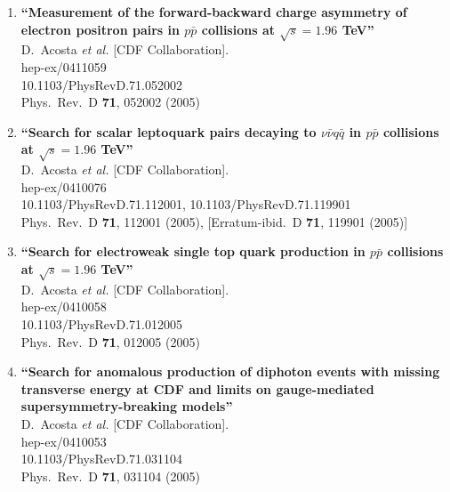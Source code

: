 \documentclass{article}
\begin{document}
\begin{enumerate}
\item%
{\bf ``Measurement of the forward-backward charge asymmetry of electron positron pairs in $p\bar{p}$ collisions at $\sqrt{s} = 1.96$ TeV''}
  \\{}D.~Acosta {\it et al.}  [CDF Collaboration].
  \\{}hep-ex/0411059
    \\{}10.1103/PhysRevD.71.052002
\\{}Phys.\ Rev.\ D {\bf 71}, 052002 (2005) %


\item%
{\bf ``Search for scalar leptoquark pairs decaying to $\nu \bar{\nu} q \bar{q}$ in $p\bar{p}$ collisions at $\sqrt{s} = 1.96$ TeV''}
  \\{}D.~Acosta {\it et al.}  [CDF Collaboration].
  \\{}hep-ex/0410076
    \\{}10.1103/PhysRevD.71.112001, 10.1103/PhysRevD.71.119901
\\{}Phys.\ Rev.\ D {\bf 71}, 112001 (2005), [Erratum-ibid.\ D {\bf 71}, 119901 (2005)] %


\item%
{\bf ``Search for electroweak single top quark production in $p\bar{p}$ collisions at $\sqrt{s} = 1.96$ TeV''}
  \\{}D.~Acosta {\it et al.}  [CDF Collaboration].
  \\{}hep-ex/0410058
    \\{}10.1103/PhysRevD.71.012005
\\{}Phys.\ Rev.\ D {\bf 71}, 012005 (2005) %


\item%
{\bf ``Search for anomalous production of diphoton events with missing transverse energy at CDF and limits on gauge-mediated supersymmetry-breaking models''}
  \\{}D.~Acosta {\it et al.}  [CDF Collaboration].
  \\{}hep-ex/0410053
    \\{}10.1103/PhysRevD.71.031104
\\{}Phys.\ Rev.\ D {\bf 71}, 031104 (2005) %



\end{enumerate}
\end{document}
